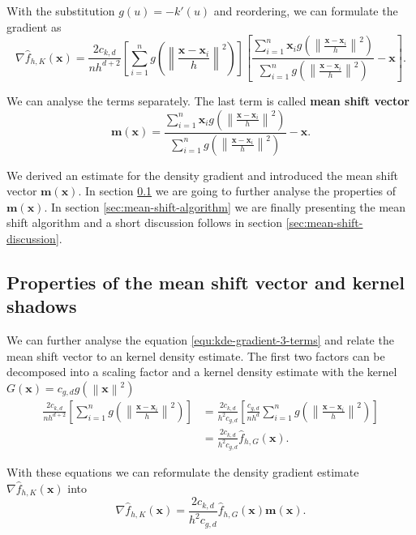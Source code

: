 \documentclass{article}
\newcommand{\norm}[1]{\left\lVert#1\right\rVert}
\begin{document}
With the substitution $g(u) = -k'(u)$ and reordering, we can formulate the gradient as
\begin{equation}
	\nabla \hat{f}_{h,K}(\bm{x}) = \frac{2c_{k,d}}{nh^{d+2}} \left[\sum_{i=1}^n g\left(\norm{\frac{\bm{x} - \bm{x}_i}{h}}^2 \right)\right] \left[\frac{\sum_{i=1}^n \bm{x}_i g\left(\norm{\frac{\bm{x} - \bm{x}_i}{h}}^2 \right)}{\sum_{i=1}^n g\left(\norm{\frac{\bm{x} - \bm{x}_i}{h}}^2 \right)} - \bm{x}\right]\text{.}
	\label{equ:kde-gradient-3-terms}
\end{equation}

We can analyse the terms separately. The last term is called \textbf{mean shift vector}
\begin{equation}
	\bm{m}(\bm{x}) = \frac{\sum_{i=1}^n \bm{x}_i g\left(\norm{\frac{\bm{x} - \bm{x}_i}{h}}^2 \right)}{\sum_{i=1}^n g\left(\norm{\frac{\bm{x} - \bm{x}_i}{h}}^2 \right)} - \bm{x}\text{.}
\end{equation}

We derived an estimate for the density gradient and introduced the mean shift vector $\bm{m}(\bm{x})$. In section \ref{sec:mean-shift-vector-properties} we are going to further analyse the properties of $\bm{m}(\bm{x})$. In section \ref{sec:mean-shift-algorithm} we are finally presenting the mean shift algorithm and a short discussion follows in section \ref{sec:mean-shift-discussion}.



\subsection{Properties of the mean shift vector and kernel shadows} \label{sec:mean-shift-vector-properties}

We can further analyse the equation \ref{equ:kde-gradient-3-terms} and relate the mean shift vector to an kernel density estimate. The first two factors can be decomposed into a scaling factor and a kernel density estimate with the kernel $G(\bm{x}) = c_{g,d} g(\norm{\bm{x}}^2)$
\begin{align}
	\frac{2c_{k,d}}{nh^{d+2}} \left[\sum_{i=1}^n g\left(\norm{\frac{\bm{x} - \bm{x}_i}{h}}^2 \right)\right] &= \frac{2c_{k,d}}{h^2c_{g,d}} \left[\frac{c_{g,d}}{nh^d} \sum_{i=1}^n g\left(\norm{\frac{\bm{x} - \bm{x}_i}{h}}^2 \right) \right]\\
	&= \frac{2c_{k,d}}{h^2c_{g,d}} \hat{f}_{h,G}(\bm{x})\text{.}
\end{align}

With these equations we can reformulate the density gradient estimate $\nabla \hat{f}_{h,K}(\bm{x})$ into
\begin{equation}
	\nabla \hat{f}_{h,K}(\bm{x}) = \frac{2c_{k,d}}{h^2c_{g,d}} \hat{f}_{h,G}(\bm{x}) \bm{m}(\bm{x})\text{.}
\end{equation}
\end{document}
